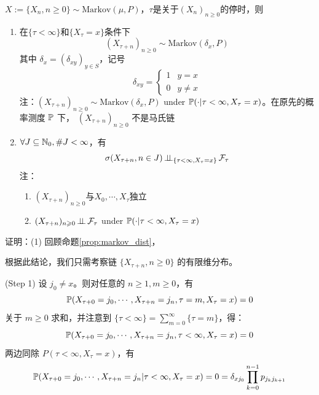 \begin{proposition}[强马氏性]
    $X:=\{X_n,n\geq 0\}\sim \text{Markov}(\mu,P)$，$\tau$是关于$(X_n)_{n\geq 0}$的停时，则
    \begin{enumerate}
        \item 在$\{\tau<\infty\}$和$\{X_{\tau}=x\}$条件下
        \[
        (X_{\tau+n})_{n\geq 0}\sim\text{Markov}(\delta_x,P)
        \]
        其中 $\delta_x=(\delta_{xy})_{y\in S}$，记号
        \[
        \delta_{xy}=\begin{cases}
            1 & y=x\\
            0 & y\neq x
        \end{cases}
        \]
        注：$(X_{\tau+n})_{n\geq 0}\sim \text{Markov}(\delta_x,P)$ under $\mathbb{P}(\cdot|\tau<\infty,X_{\tau}=x)$。在原先的概率测度 $\mathbb{P}$ 下， $(X_{\tau+n})_{n\geq 0}$ 不是马氏链
        \item $\forall J\subseteq \mathbb{N}_0, \#J<\infty$，有
        \[
        \sigma(X_{\tau+n},n\in J)\operatorname{\perp\!\!\!\perp}_{\{\tau<\infty,X_{\tau}=x\}}\mathcal{F}_{\tau}
        \]
        注：\begin{enumerate}
            \item $(X_{\tau+n})_{n\geq 0}$与$X_0,\cdots,X_{\tau}$独立
            \item $(X_{\tau+n})_{n\geqslant 0}\operatorname{\perp\!\!\!\perp} \mathcal{F}_{\tau}$ under $\mathbb{P}(\cdot|\tau<\infty,X_{\tau}=x)$
        \end{enumerate}
    \end{enumerate}
\end{proposition}

证明：(1) 回顾命题\ref{prop:markov_dist}，

根据此结论，我们只需考察链 \(\{X_{\tau + n}, n \geq 0\}\) 的有限维分布。

(Step 1) 设 \(j_0 \neq x\)。则对任意的 \(n \geq 1, m \geq 0\)，有
\[
\mathbb{P}(X_{\tau + 0} = j_0, \cdots, X_{\tau + n} = j_n, \tau = m, X_\tau = x) = 0
\]
关于 \(m \geq 0\) 求和，并注意到 \(\{\tau < \infty\} = \sum_{m=0}^{\infty} \{\tau = m\}\)，得：
\[
\mathbb{P}(X_{\tau + 0} = j_0, \cdots, X_{\tau + n} = j_n, \tau < \infty, X_\tau = x) = 0
\]
两边同除 \(P(\tau < \infty, X_\tau = x)\)，有
\[
\mathbb{P}(X_{\tau + 0} = j_0, \cdots, X_{\tau + n} = j_n | \tau < \infty, X_\tau = x) = 0 = \delta_{x j_0} \prod_{k=0}^{n-1} p_{j_k j_{k+1}}
\]

